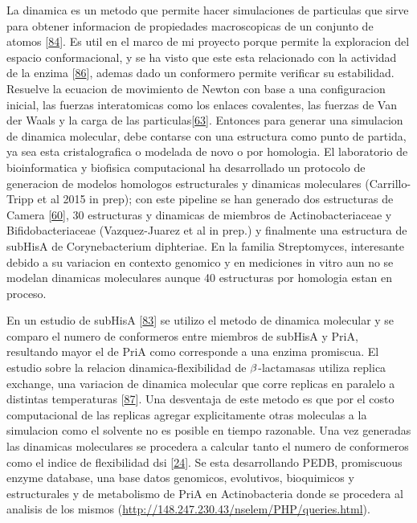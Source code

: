\documentclass[12pt,twoside]{reedthesis}
\begin{document}
  La dinamica es un metodo que permite hacer simulaciones de particulas
  que sirve para obtener informacion de propiedades macroscopicas de un
  conjunto de atomos
  {[}\protect\hyperlink{ref-petrenko_molecular_2001}{84}{]}. Es util en el
  marco de mi proyecto porque permite la exploracion del espacio
  conformacional, y se ha visto que este esta relacionado con la actividad
  de la enzima {[}\protect\hyperlink{ref-sikosek_biophysics_2014}{86}{]},
  ademas dado un conformero permite verificar su estabilidad. Resuelve la
  ecuacion de movimiento de Newton con base a una configuracion inicial,
  las fuerzas interatomicas como los enlaces covalentes, las fuerzas de
  Van der Waals y la carga de las
  particulas{[}\protect\hyperlink{ref-campbell_biophysical_2012}{63}{]}.
  Entonces para generar una simulacion de dinamica molecular, debe
  contarse con una estructura como punto de partida, ya sea esta
  cristalografica o modelada de novo o por homologia. El laboratorio de
  bioinformatica y biofisica computacional ha desarrollado un protocolo de
  generacion de modelos homologos estructurales y dinamicas moleculares
  (Carrillo-Tripp et al 2015 in prep); con este pipeline se han generado
  dos estructuras de Camera
  {[}\protect\hyperlink{ref-noda-garcia_insights_2015}{60}{]}, 30
  estructuras y dinamicas de miembros de Actinobacteriaceae y
  Bifidobacteriaceae (Vazquez-Juarez et al in prep.) y finalmente una
  estructura de subHisA de Corynebacterium diphteriae. En la familia
  Streptomyces, interesante debido a su variacion en contexto genomico y
  en mediciones in vitro aun no se modelan dinamicas moleculares aunque 40
  estructuras por homologia estan en proceso.
  
  En un estudio de subHisA
  {[}\protect\hyperlink{ref-noda_estudio_2012}{83}{]} se utilizo el metodo
  de dinamica molecular y se comparo el numero de conformeros entre
  miembros de subHisA y PriA, resultando mayor el de PriA como corresponde
  a una enzima promiscua. El estudio sobre la relacion
  dinamica-flexibilidad de \(\noindent\beta\)-lactamasas utiliza replica
  exchange, una variacion de dinamica molecular que corre replicas en
  paralelo a distintas temperaturas
  {[}\protect\hyperlink{ref-bai_replica_2006}{87}{]}. Una desventaja de
  este metodo es que por el costo computacional de las replicas agregar
  explicitamente otras moleculas a la simulacion como el solvente no es
  posible en tiempo razonable. Una vez generadas las dinamicas moleculares
  se procedera a calcular tanto el numero de conformeros como el indice de
  flexibilidad dsi {[}\protect\hyperlink{ref-zou_evolution_2015}{24}{]}.
  Se esta desarrollando PEDB, promiscuous enzyme database, una base datos
  genomicos, evolutivos, bioquimicos y estructurales y de metabolismo de
  PriA en Actinobacteria donde se procedera al analisis de los mismos
  (\url{http://148.247.230.43/nselem/PHP/queries.html}).
  
\end{document}
